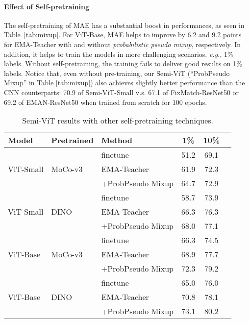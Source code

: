 \documentclass{article}
\newcommand\eg{\emph{e.g.}}
\begin{document}
\paragraph{Effect of Self-pretraining} The self-pretraining of MAE \cite{he2021masked} has a substantial boost in performances, as seen in Table~\ref{tab:mixup}. For ViT-Base, MAE helps to improve by 6.2 and 9.2 points for EMA-Teacher with and without \emph{probabilistic pseudo mixup}, respectively. In addition, it helps to train the models in more challenging scenarios, \eg, 1\% labels. Without self-pretraining, the training fails to deliver good results on 1\% labels. Notice that, even without pre-training, our Semi-ViT (``ProbPseudo Mixup'' in Table \ref{tab:mixup}) also achieves slightly better performance than the CNN counterparts: 70.9 of Semi-ViT-Small v.s. 67.1 of FixMatch-ResNet50 or 69.2 \cite{DBLP:conf/nips/SohnBCZZRCKL20} of EMAN-ResNet50 \cite{DBLP:conf/cvpr/CaiRMFTS21} when trained from scratch for 100 epochs. 


\setlength{\tabcolsep}{8pt}
\begin{table}[t]
\begin{center}
\small
\begin{tabular}{lllccc}
\toprule
Model &Pretrained & Method & 1\% & 10\% \\\hline
\multirow{3}{*}{ViT-Small} &\multirow{3}{*}{MoCo-v3 \cite{DBLP:conf/iccv/ChenXH21}} &finetune &51.2 &69.1 \\
& &EMA-Teacher &61.9 &72.3 \\
& &+ProbPseudo Mixup &64.7 &72.9 \\\hline
\multirow{3}{*}{ViT-Small} &\multirow{3}{*}{DINO \cite{DBLP:conf/iccv/CaronTMJMBJ21}} &finetune &58.7 &73.9 \\
& &EMA-Teacher &66.3 &76.3 \\
& &+ProbPseudo Mixup &68.0 &77.1 \\\hline
\multirow{3}{*}{ViT-Base} &\multirow{3}{*}{MoCo-v3 \cite{DBLP:conf/iccv/ChenXH21}} &finetune &66.3 &74.5 \\
& &EMA-Teacher &68.9 &77.7 \\
& &+ProbPseudo Mixup &72.3 &79.2 \\\hline
\multirow{3}{*}{ViT-Base} &\multirow{3}{*}{DINO \cite{DBLP:conf/iccv/CaronTMJMBJ21}} &finetune &65.0 &76.0 \\
& &EMA-Teacher &70.8 &78.1 \\
& &+ProbPseudo Mixup &73.1 &80.2 \\
\bottomrule
\end{tabular}
\caption{Semi-ViT results with other self-pretraining techniques.}
\label{tab:other self-pretraining}
\end{center}\vspace{-3mm}
\end{table}
\end{document}
